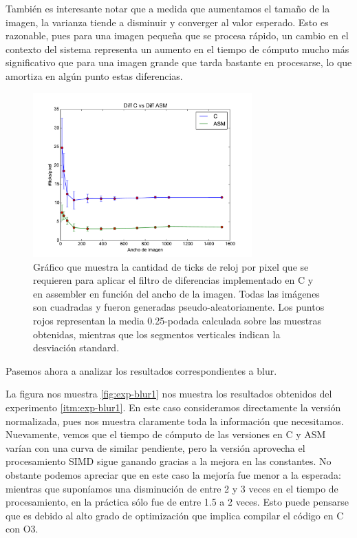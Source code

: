 También es interesante notar que a medida que aumentamos el tamaño de la imagen, la varianza tiende a disminuir y converger al valor esperado. Esto es razonable, pues para una imagen pequeña que se procesa rápido, un cambio en el contexto del sistema representa un aumento en el tiempo de cómputo mucho más significativo que para una imagen grande que tarda bastante en procesarse, lo que amortiza en algún punto estas diferencias.

\begin{figure}
 	\centering
 	\includegraphics[width=0.75\textwidth]{../graficos/diff_gcc.pdf}
	\caption{\footnotesize Gráfico que muestra la cantidad de ticks de reloj por pixel que se requieren para aplicar el filtro de diferencias implementado en C y en assembler en función del ancho de la imagen. Todas las imágenes son cuadradas y fueron generadas pseudo-aleatoriamente. Los puntos rojos representan la media 0.25-podada calculada sobre las muestras obtenidas, mientras que los segmentos verticales indican la desviación standard.}
	\label{fig:exp-diff-line}
\end{figure}


Pasemos ahora a analizar los resultados correspondientes a blur.

La figura nos muestra \ref{fig:exp-blur1} nos muestra los resultados obtenidos del experimento \ref{itm:exp-blur1}. En este caso consideramos directamente la versión normalizada, pues nos muestra claramente toda la información que necesitamos. Nuevamente, vemos que el tiempo de cómputo de las versiones en C y ASM varían con una curva de similar pendiente, pero la versión aprovecha el procesamiento SIMD sigue ganando gracias a la mejora en las constantes. No obstante podemos apreciar que en este caso la mejoría fue menor a la esperada: mientras que suponíamos una disminución de entre 2 y 3 veces en el tiempo de procesamiento, en la práctica sólo fue de entre 1.5 a 2 veces. Esto puede pensarse que es debido al alto grado de optimización que implica compilar el código en C con O3.



